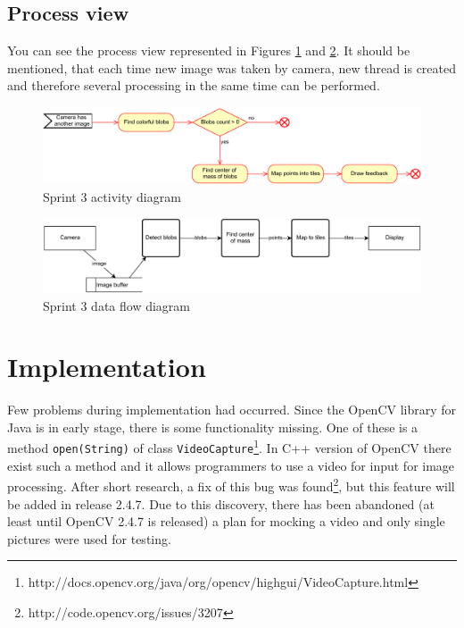\subsection{Process view}
You can see the process view represented in Figures \ref{fig:sprint3_activity_diagram} and \ref{fig:sprint3_dfd}.
It should be mentioned, that each time new image was taken by camera, new thread is created and therefore several processing in the same time can be performed.

\begin{figure}[H]
	\centering
		\includegraphics[width=16.2cm]{sprint3/sprint3_activity.pdf}
	\caption{Sprint 3 activity diagram}
	\label{fig:sprint3_activity_diagram}
\end{figure}


\begin{figure}[H]
	\centering
		\includegraphics[width=16.2cm]{sprint3/sprint3_dtd.pdf}
	\caption{Sprint 3 data flow diagram}
	\label{fig:sprint3_dfd}
\end{figure}


\section{Implementation}

Few problems during implementation had occurred. 
Since the OpenCV library for Java is in early stage, there is some functionality missing.
One of these is a method \texttt{open(String)} of class \texttt{VideoCapture}\footnote{http://docs.opencv.org/java/org/opencv/highgui/VideoCapture.html}.
In C++ version of OpenCV there exist such a method and it allows programmers to use a video for input for image processing.
After short research, a fix of this bug was found\footnote{http://code.opencv.org/issues/3207}, but this feature will be added in release 2.4.7.
Due to this discovery, there has been abandoned (at least until OpenCV 2.4.7 is released) a plan for mocking a video and only single pictures were used for testing.


